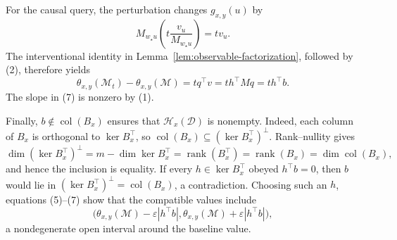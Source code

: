 For the causal query, the perturbation changes \(g_{x,y}(u)\) by
\[
M_{w_{\star}u}\left(t\frac{v_u}{M_{w_{\star}u}}\right)=tv_u.
\tag{6}
\]
The interventional identity in Lemma~\ref{lem:observable-factorization}, followed by (2), therefore yields
\[
\theta_{x,y}(\mathcal M_t)-\theta_{x,y}(\mathcal M)
=tq^{\top}v
=t h^{\top}Mq
=t h^{\top}b.
\tag{7}
\]
The slope in (7) is nonzero by (1).

Finally, \(b\notin\operatorname{col}(B_x)\) ensures that \(\mathcal H_x(\mathcal D)\) is nonempty. Indeed, each column of \(B_x\) is orthogonal to \(\ker B_x^{\top}\), so \(\operatorname{col}(B_x)\subseteq(\ker B_x^{\top})^{\perp}\). Rank--nullity gives
\[
\dim (\ker B_x^{\top})^{\perp}
=m-\dim\ker B_x^{\top}
=\operatorname{rank}(B_x^{\top})
=\operatorname{rank}(B_x)
=\dim\operatorname{col}(B_x),
\]
and hence the inclusion is equality. If every \(h\in\ker B_x^{\top}\) obeyed \(h^{\top}b=0\), then \(b\) would lie in \((\ker B_x^{\top})^{\perp}=\operatorname{col}(B_x)\), a contradiction. Choosing such an \(h\), equations (5)--(7) show that the compatible values include
\[
\bigl(\theta_{x,y}(\mathcal M)-\varepsilon|h^{\top}b|,
      \theta_{x,y}(\mathcal M)+\varepsilon|h^{\top}b|\bigr),
\tag{8}
\]
a nondegenerate open interval around the baseline value.